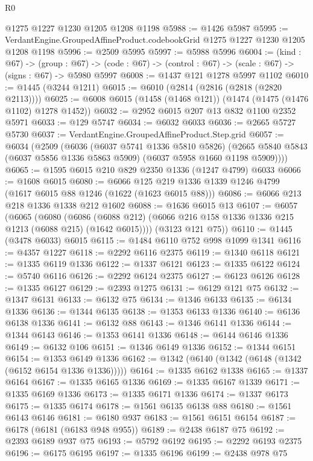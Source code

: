 \begin{lexlean}{R0}
\begin{coremodule}
    @1275
    @1227
    @1230
    @1205
    @1208
    @1198
@5988 := @1426 @5987
@5995 := VerdantEngine.GroupedAffineProduct.codebookGrid @1275 @1227 @1230 @1205 @1208 @1198
@5996 := @2509 @5995
@5997 := @5988 @5996
@6004 := (kind : @67) ->
  (group : @67) -> (code : @67) -> (control : @67) -> (scale : @67) -> (signs : @67) -> @5980 @5997
@6008 := @1437 @121 @1278 @5997 @1102
@6010 := @1445 (@3244 @1211)
@6015 := @6010 (@2814 (@2816 (@2818 (@2820 @2113))))
@6025 := @6008 @6015 (@1458 (@1468 @121)) (@1474 (@1475 (@1476 @1102) @1278 @1452))
@6032 := @2952 @6015 @207 @13 @832 @1100 @2352 @5971
@6033 := @129 @5747
@6034 := @6032 @6033
@6036 := @2665 @5727 @5730
@6037 := VerdantEngine.GroupedAffineProduct.Step.grid
@6057 := @6034
    (@2509
      (@6036
        (@6037 @5741 @1336 @5810 @5826)
        (@2665 @5840 @5843 (@6037 @5856 @1336 @5863 @5909) (@6037 @5958 @1660 @1198 @5909))))
@6065 := @1595 @6015 @210 @829 @2350 @1336 (@1247 @4799) @6033
@6066 := @1608 @6015
@6080 := @6066 @125 @219 @1336 @1339 @1246 @4799 (@1617 @6015 @88 @1246 (@1622 (@1623 @6015 @88)))
@6086 := @6066 @213 @218 @1336 @1338 @212 @1602
@6088 := @1636 @6015 @13
@6107 := @6057
    (@6065
      (@6080
        (@6086 (@6088 @212) (@6066 @216 @158 @1336 @1336 @215 @1213 (@6088 @215) (@1642 @6015))))
      (@3123 @121 @75))
@6110 := @1445 (@3478 @6033) @6015
@6115 := @1484 @6110 @752 @998 @1099 @1341
@6116 := @4357 @1227
@6118 := @2292 @6116 @2375
@6119 := @1340 @6118
@6121 := @1335 @6119 @1336
@6122 := @1337 @6121
@6123 := @1335 @6122
@6124 := @5740 @6116
@6126 := @2292 @6124 @2375
@6127 := @6123 @6126
@6128 := @1335 @6127
@6129 := @2393 @1275
@6131 := @6129 @121 @75
@6132 := @1347 @6131
@6133 := @6132 @75
@6134 := @1346 @6133
@6135 := @6134 @1336
@6136 := @1344 @6135
@6138 := @1353 @6133 @1336
@6140 := @6136 @6138 @1336
@6141 := @6132 @88
@6143 := @1346 @6141 @1336
@6144 := @1344 @6143
@6146 := @1353 @6141 @1336
@6148 := @6144 @6146 @1336
@6149 := @6132 @106
@6151 := @1346 @6149 @1336
@6152 := @1344 @6151
@6154 := @1353 @6149 @1336
@6162 := @1342 (@6140 (@1342 (@6148 (@1342 (@6152 @6154 @1336 @1336)))))
@6164 := @1335 @6162 @1338
@6165 := @1337 @6164
@6167 := @1335 @6165 @1336
@6169 := @1335 @6167 @1339
@6171 := @1335 @6169 @1336
@6173 := @1335 @6171 @1336
@6174 := @1337 @6173
@6175 := @1335 @6174
@6178 := @1561 @6135 @6138 @88
@6180 := @1561 @6143 @6146
@6181 := @6180 @937
@6183 := @1561 @6151 @6154
@6187 := @6178 (@6181 (@6183 @948 @955))
@6189 := @2438 @6187 @75
@6192 := @2393 @6189 @937 @75
@6193 := @5792 @6192
@6195 := @2292 @6193 @2375
@6196 := @6175 @6195
@6197 := @1335 @6196
@6199 := @2438 @978 @75

\end{coremodule}
\end{lexlean}

